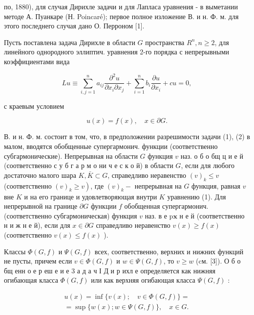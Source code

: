 \documentclass[10pt]{article}
\begin{document}
по, 1880), для случая Дирихле задачи и для Лапласа уравнения - в выметании методе А. Пуанкаре (Н. Poincaré); первое полное изложение В. и н. Ф. м. для этого последнего случая дано О. Перроном [1].



Пусть поставлена задача Дирихле в области $G$ пространства $R^{n}, n \geqslant 2$, для линейного однородного эллиптич. уравнения 2-го порядка с непрерывными коэффициентами вида



\[

L u \equiv \sum_{i, j=1}^{n} a_{i j} \frac{\partial^{2} u}{\partial x_{i} \partial x_{j}}+\sum_{i=1}^{n} b_{i} \frac{\partial u}{\partial x_{i}}+c u=0,

\]



с краевым условием



\[

u(x)=f(x), \quad x \in \partial G .

\]



В. и н. Ф. м. состоит в том, что, в предположении разрешимости задачи (1), (2) в малом, вводятся обобщенные супергармонич. функции (соответственно субгармонические). Непрерывная на области $G$ функция $v$ наз. о б о бщ ц и е й (соответственно с у б г а р м о ни ч е с к о й) в области $G$, если для любого достаточно малого шара $K, \bar{K} \subset G$, справедливо неравенство $(v)_{k} \leqslant v$ (соответственно $\left.(v)_{k} \geqslant v\right)$, где $(v)_{k}-$ непрерывная на $G$ функция, равная $v$ вне $K$ и на его границе и удовлетворяющая внутри $K$ уравнению (1). Для непрерывной на границе $\partial G$ функции $f$ обобщенная супергармонич. (соответственно субгармоническая) функция $v$ наз. в е $\mathrm{p} \mathbf{x}$ н е й (соответственно н и ж н е й), если для $x \in \partial G$ справедливо неравенство $v(x) \geqslant f(x)$ (соответственно $v(x) \leqslant f(x)$ ).



Классы $\Phi(G, f)$ и $\Psi(G, f)$ всех, соответственно, верхних и нижних функций не пусты, причем если $v \in \Phi(G, f)$ и $w \in \Psi(G, f)$, то $v \geqslant w$ (cм. [3]). О б о бщ енн о е р еш е и е 3 а д а ч І Д и р ихл е определяется как нижняя огибающая класса $\Phi(G, f)$ или как верхняя огибающая класса $\Psi(G, f)$ :



\[

\begin{gathered}

u(x)=\inf \{v(x) ; \quad v \in \Phi(G, f)\}= \\

=\sup \{w(x) ; w \in \Psi(G, f)\}, \quad x \in G .

\end{gathered}

\]
\end{document}
